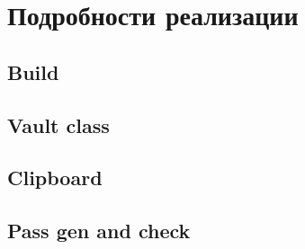\chapter{Подробности реализации}
\section{Build}
\section{Vault class}
\section{Clipboard}
\section{Pass gen and check}